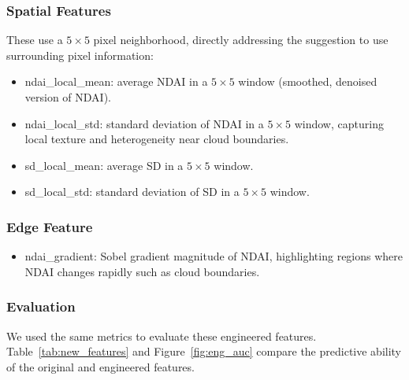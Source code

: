 \documentclass[10pt,letterpaper]{article}
\begin{document}
\subsubsection*{Spatial Features}
These use a $5 \times 5$ pixel neighborhood, directly addressing the suggestion to use surrounding pixel information:
\begin{itemize}
    \item ndai\_local\_mean: average NDAI in a $5 \times 5$ window (smoothed, denoised version of NDAI).
    \item ndai\_local\_std: standard deviation of NDAI in a $5 \times 5$ window, capturing local texture and heterogeneity near cloud boundaries.
    \item sd\_local\_mean: average SD in a $5 \times 5$ window.
    \item sd\_local\_std: standard deviation of SD in a $5 \times 5$ window.
\end{itemize}
 
\subsubsection*{Edge Feature}
\begin{itemize}
    \item ndai\_gradient: Sobel gradient magnitude of NDAI, highlighting regions where NDAI changes rapidly such as cloud boundaries.
\end{itemize}

\subsubsection*{Evaluation}
We used the same metrics to evaluate these engineered features. Table~\ref{tab:new_features} and Figure~\ref{fig:eng_auc} compare the predictive ability of the original and engineered features. 
\end{document}
